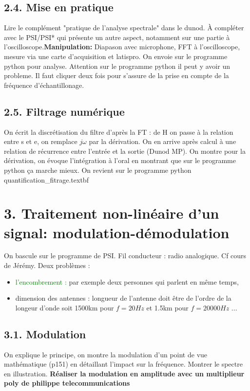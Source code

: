 \documentclass[french, a4paper, 10pt, twocolumn, landscape]{article}
\begin{document}
\subsection*{2.4. Mise en pratique}

Lire le complément "pratique de l'analyse spectrale" dans le dunod. À compléter avec le PSI/PSI* qui présente un autre aspect, notamment sur une partie à l'oscilloscope.\textbf{Manipulation:} Diapason avec microphone, FFT à l'oscilloscope, mesure via une carte d'acquisition et latispro. On envoie sur le programme python pour analyse. Attention sur le programme python il peut y avoir un probleme. Il faut cliquer deux fois pour s'assure de la prise en compte de la fréquence d'échantillonage.

\subsection*{2.5. Filtrage numérique}

On écrit la discrétisation du filtre d'après la FT : de H on passe à la relation entre s et e, on remplace $j\omega$ par la dérivation. On en arrive après calcul à une relation de récurrence entre l'entrée et la sortie (Dunod MP). On montre pour la dérivation, on évoque l'intégration à l'oral en montrant que sur le programme python ça marche mieux. On revient sur le programme python quantification_fitrage.textbf

\section*{3. Traitement non-linéaire d'un signal: modulation-démodulation}

On bascule sur le programme de PSI. 
Fil conducteur : radio analogique. Cf cours de Jérémy.
Deux problèmes : 
\begin{itemize}
    \item \textcolor{green}{l'encombrement :} par exemple deux personnes qui parlent en même temps,
    \item dimension des antennes : longueur de l'antenne doit être de l'ordre de la longeur d'onde soit 1500km pour $f=20Hz$ et 1.5km pour $f=20000Hz$ ...
\end{itemize}


\subsection*{3.1. Modulation}

On explique le principe, on montre la modulation d'un point de vue mathématique (p151) en détaillant l'impact sur la fréquence. Montrer le spectre en illustration. \textbf{Réaliser la modulation en amplitude avec un multiplieur poly de philippe telecommunications } 
\end{document}
